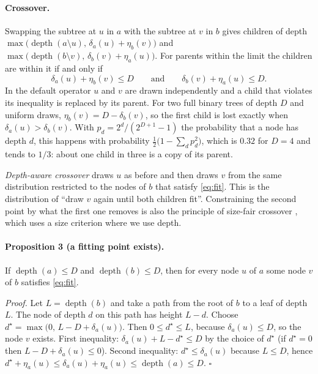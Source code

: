 \paragraph{Crossover.} Swapping the subtree at $u$ in $a$ with the subtree at $v$
in $b$ gives children of depth
$\max\bigl(\operatorname{depth}(a\setminus u),\,\delta_a(u)+\eta_b(v)\bigr)$ and
$\max\bigl(\operatorname{depth}(b\setminus v),\,\delta_b(v)+\eta_a(u)\bigr)$. For
parents within the limit the children are within it if and only if
\begin{equation}
  \delta_a(u)+\eta_b(v)\le D\qquad\text{and}\qquad\delta_b(v)+\eta_a(u)\le D .
  \label{eq:fit}
\end{equation}
In the default operator $u$ and $v$ are drawn independently and a child that
violates its inequality is replaced by its parent. For two full binary trees of
depth $D$ and uniform draws, $\eta_b(v)=D-\delta_b(v)$, so the first child is
lost exactly when $\delta_a(u)>\delta_b(v)$. With $p_d=2^d/(2^{D+1}-1)$ the
probability that a node has depth $d$, this happens with probability
$\tfrac12\bigl(1-\sum_dp_d^2\bigr)$, which is $0.32$ for $D=4$ and tends to $1/3$:
about one child in three is a copy of its parent.

\emph{Depth-aware crossover} draws $u$ as before and then draws $v$ from the same
distribution restricted to the nodes of $b$ that satisfy \eqref{eq:fit}. This is
the distribution of ``draw $v$ again until both children fit''. Constraining the
second point by what the first one removes is also the principle of size-fair
crossover \citep{langdon2000sizefair}, which uses a size criterion where we use
depth.

\paragraph{Proposition 3 (a fitting point exists).} If
$\operatorname{depth}(a)\le D$ and $\operatorname{depth}(b)\le D$, then for every
node $u$ of $a$ some node $v$ of $b$ satisfies \eqref{eq:fit}.

\emph{Proof.} Let $L=\operatorname{depth}(b)$ and take a path from the root of $b$
to a leaf of depth $L$. The node of depth $d$ on this path has height $L-d$.
Choose $d^\star=\max\bigl(0,\,L-D+\delta_a(u)\bigr)$. Then $0\le d^\star\le L$,
because $\delta_a(u)\le D$, so the node $v$ exists. First inequality:
$\delta_a(u)+L-d^\star\le D$ by the choice of $d^\star$ (if $d^\star=0$ then
$L-D+\delta_a(u)\le0$). Second inequality: $d^\star\le\delta_a(u)$ because
$L\le D$, hence
$d^\star+\eta_a(u)\le\delta_a(u)+\eta_a(u)\le\operatorname{depth}(a)\le D$.
\hfill$\square$

